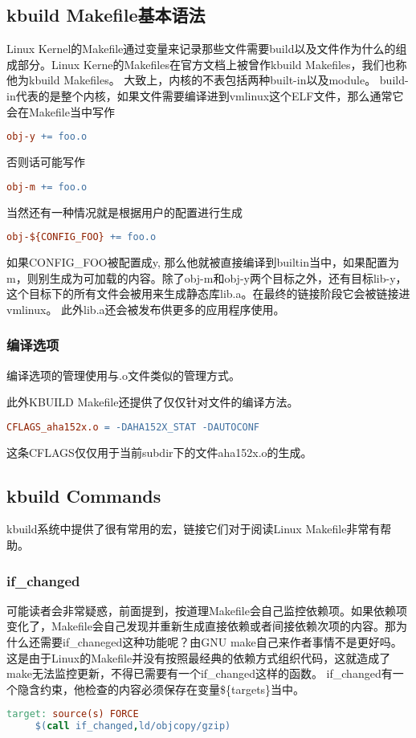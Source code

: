 \subsection{kbuild Makefile基本语法}
Linux Kernel的Makefile通过变量来记录那些文件需要build以及文件作为什么的组成部分。Linux Kerne的Makefiles在官方文档上被曾作kbuild Makefiles，我们也称他为kbuild Makefiles。
大致上，内核的不表包括两种built-in以及module。
build-in代表的是整个内核，如果文件需要编译进到vmlinux这个ELF文件，那么通常它会在Makefile当中写作
 \begin{lstlisting}[language=make]
  obj-y += foo.o
 \end{lstlisting}
否则话可能写作
 \begin{lstlisting}[language=make]
  obj-m += foo.o
 \end{lstlisting}
当然还有一种情况就是根据用户的配置进行生成
 \begin{lstlisting}[language=make]
  obj-${CONFIG_FOO} += foo.o
 \end{lstlisting}
如果CONFIG\_FOO被配置成y, 那么他就被直接编译到built\-in当中，如果配置为m，则别生成为可加载的内容。除了obj-m和obj-y两个目标之外，还有目标lib-y，这个目标下的所有文件会被用来生成静态库lib.a。在最终的链接阶段它会被链接进vmlinux。
此外lib.a还会被发布供更多的应用程序使用。

\subsubsection{编译选项}
编译选项的管理使用与.o文件类似的管理方式。


此外KBUILD Makefile还提供了仅仅针对文件的编译方法。
\begin{lstlisting}[language=make]
 CFLAGS_aha152x.o = -DAHA152X_STAT -DAUTOCONF
\end{lstlisting}
这条CFLAGS仅仅用于当前subdir下的文件aha152x.o的生成。

\subsection{kbuild Commands}
kbuild系统中提供了很有常用的宏，链接它们对于阅读Linux Makefile非常有帮助。
\subsubsection{if\_changed}
可能读者会非常疑惑，前面提到，按道理Makefile会自己监控依赖项。如果依赖项变化了，Makefile会自己发现并重新生成直接依赖或者间接依赖次项的内容。那为什么还需要if\_chaneged这种功能呢？由GNU make自己来作者事情不是更好吗。
这是由于Linux的Makefile并没有按照最经典的依赖方式组织代码，这就造成了make无法监控更新，不得已需要有一个if\_changed这样的函数。
if\_changed有一个隐含约束，他检查的内容必须保存在变量\$\{targets\}当中。
\begin{lstlisting}[language=make]
 target: source(s) FORCE
     $(call if_changed,ld/objcopy/gzip)
\end{lstlisting}

